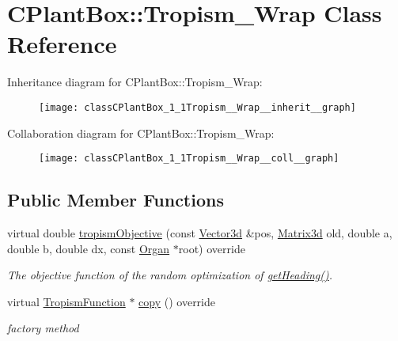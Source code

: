 \hypertarget{classCPlantBox_1_1Tropism__Wrap}{}\section{C\+Plant\+Box\+:\+:Tropism\+\_\+\+Wrap Class Reference}
\label{classCPlantBox_1_1Tropism__Wrap}


Inheritance diagram for C\+Plant\+Box\+:\+:Tropism\+\_\+\+Wrap\+:\nopagebreak
\begin{figure}[H]
\begin{center}
\leavevmode
\texttt{[image: classCPlantBox\_1\_1Tropism\_\_Wrap\_\_inherit\_\_graph]}
\end{center}
\end{figure}


Collaboration diagram for C\+Plant\+Box\+:\+:Tropism\+\_\+\+Wrap\+:\nopagebreak
\begin{figure}[H]
\begin{center}
\leavevmode
\texttt{[image: classCPlantBox\_1\_1Tropism\_\_Wrap\_\_coll\_\_graph]}
\end{center}
\end{figure}
\subsection*{Public Member Functions}
\begin{DoxyCompactItemize}
\item 
virtual double \hyperlink{classCPlantBox_1_1Tropism__Wrap_a00aba49f282f1013a15f9244c263be09}{tropism\+Objective} (const \hyperlink{classCPlantBox_1_1Vector3d}{Vector3d} \&pos, \hyperlink{classCPlantBox_1_1Matrix3d}{Matrix3d} old, double a, double b, double dx, const \hyperlink{classCPlantBox_1_1Organ}{Organ} $\ast$root) override
\begin{DoxyCompactList}\small\item\em The objective function of the random optimization of \hyperlink{classCPlantBox_1_1TropismFunction_adb52b88734a94fe1365a00e02c7e6be5}{get\+Heading()}. \end{DoxyCompactList}\item 
\mbox{\label{classCPlantBox_1_1Tropism__Wrap_a84796c520e67c80f59f40002ccd44802}} 
virtual \hyperlink{classCPlantBox_1_1TropismFunction}{Tropism\+Function} $\ast$ \hyperlink{classCPlantBox_1_1Tropism__Wrap_a84796c520e67c80f59f40002ccd44802}{copy} () override
\begin{DoxyCompactList}\small\item\em factory method \end{DoxyCompactList}\end{DoxyCompactItemize}
